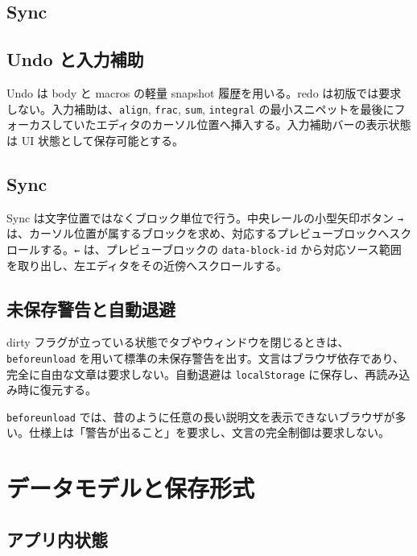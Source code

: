 \documentclass[11pt,a4paper]{ltjsarticle}
\newcommand{\code}[1]{\texttt{#1}}
\begin{document}
\subsection{Sync}

\subsection{Undo と入力補助}

Undo は body と macros の軽量 snapshot 履歴を用いる。redo は初版では要求しない。入力補助は、\code{align}, \code{frac}, \code{sum}, \code{integral} の最小スニペットを最後にフォーカスしていたエディタのカーソル位置へ挿入する。入力補助バーの表示状態は UI 状態として保存可能とする。

\subsection{Sync}

Sync は文字位置ではなくブロック単位で行う。中央レールの小型矢印ボタン \code{→} は、カーソル位置が属するブロックを求め、対応するプレビューブロックへスクロールする。\code{←} は、プレビューブロックの \code{data-block-id} から対応ソース範囲を取り出し、左エディタをその近傍へスクロールする。

\subsection{未保存警告と自動退避}

dirty フラグが立っている状態でタブやウィンドウを閉じるときは、\code{beforeunload} を用いて標準の未保存警告を出す。文言はブラウザ依存であり、完全に自由な文章は要求しない。自動退避は \code{localStorage} に保存し、再読み込み時に復元する。

\begin{warningbox}[ブラウザ制約]
\code{beforeunload} では、昔のように任意の長い説明文を表示できないブラウザが多い。仕様上は「警告が出ること」を要求し、文言の完全制御は要求しない。
\end{warningbox}

\section{データモデルと保存形式}

\subsection{アプリ内状態}
\end{document}
